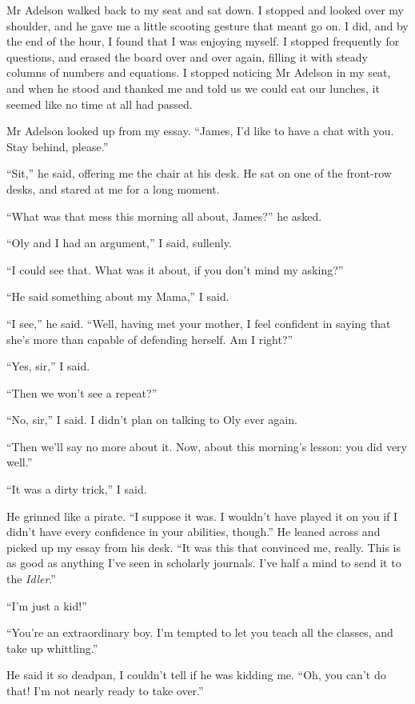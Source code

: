 Mr Adelson walked back to my seat and sat down. I stopped and
looked over my shoulder, and he gave me a little scooting gesture
that meant go on. I did, and by the end of the hour, I found that I
was enjoying myself. I stopped frequently for questions, and erased
the board over and over again, filling it with steady columns of
numbers and equations. I stopped noticing Mr Adelson in my seat,
and when he stood and thanked me and told us we could eat our
lunches, it seemed like no time at all had passed.

Mr Adelson looked up from my essay.
``James, I'd like to have a chat with you. Stay behind, please.''

``Sit,'' he said, offering me the chair at his desk. He sat on one
of the front-row desks, and stared at me for a long moment.

``What was that mess this morning all about, James?'' he asked.

``Oly and I had an argument,'' I said, sullenly.

``I could see that. What was it about, if you don't mind my asking?''

``He said something about my Mama,'' I said.

``I see,'' he said.
``Well, having met your mother, I feel confident in saying that she's more than 
capable of defending herself. Am I right?''

``Yes, sir,'' I said.

``Then we won't see a repeat?''

``No, sir,'' I said. I didn't plan on talking to Oly ever again.

``Then we'll say no more about it. Now, about this morning's lesson: you did 
very well.''

``It was a dirty trick,'' I said.

He grinned like a pirate.
``I suppose it was. I wouldn't have played it on you if I didn't have every 
confidence in your abilities, though.''
He leaned across and picked up my essay from his desk.
``It was this that convinced me, really. This is as good as anything I've seen 
in scholarly journals. I've half a mind to send it to the \emph{Idler}.''

``I'm just a kid!''

``You're an extraordinary boy. I'm tempted to let you teach all the classes, 
and take up whittling.''

He said it so deadpan, I couldn't tell if he was kidding me.
``Oh, you can't do that! I'm not nearly ready to take over.''

